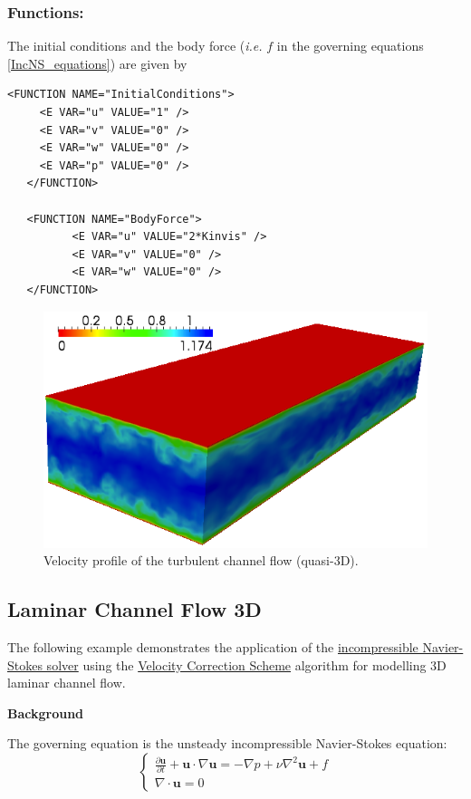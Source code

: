 \subsubsection{Functions:~} The initial conditions and the body force (\textit{i.e.} $f$ in the governing equations \ref{IncNS_equations}) are given by
\begin{lstlisting}[style=XMLStyle]
   <FUNCTION NAME="InitialConditions">
     <E VAR="u" VALUE="1" />
     <E VAR="v" VALUE="0" />
     <E VAR="w" VALUE="0" />
     <E VAR="p" VALUE="0" />
   </FUNCTION>
   
   <FUNCTION NAME="BodyForce">
          <E VAR="u" VALUE="2*Kinvis" />
          <E VAR="v" VALUE="0" />
          <E VAR="w" VALUE="0" />
   </FUNCTION>
\end{lstlisting}


\begin{figure}
\begin{center}
\includegraphics[width=12cm]{Figures/ChanCont.png}
\caption{Velocity profile of the turbulent channel flow (quasi-3D).}
\end{center}
\end{figure}


\subsection{Laminar Channel Flow 3D}
The following example demonstrates the application of the \hyperref[IncNSsolver]{incompressible Navier-Stokes solver} using the \hyperref[VCSscheme]{Velocity Correction Scheme} algorithm for modelling 3D laminar channel flow.

\textbf{Background}

The governing equation is the unsteady incompressible Navier-Stokes equation:
\begin{equation}
\begin{cases}
\frac{\partial \textbf{u}}{\partial t} + \textbf{u} \cdot \nabla \textbf{u} = - \nabla p + \nu \nabla^2 \textbf{u} + f \\
\nabla \cdot \textbf{u} = 0
\end{cases}
\end{equation}

